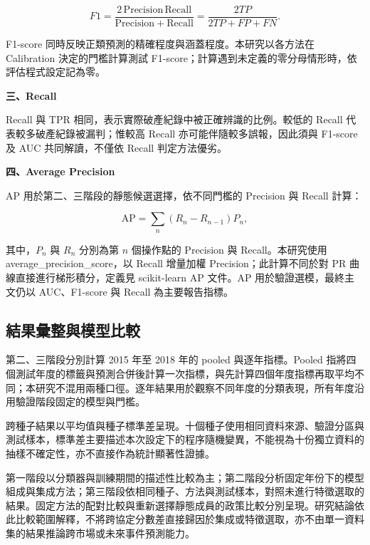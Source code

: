 \begin{equation}\label{eq:method-f1}
F1=\frac{2\,\mathrm{Precision}\,\mathrm{Recall}}
{\mathrm{Precision}+\mathrm{Recall}}
=\frac{2TP}{2TP+FP+FN}.
\end{equation}

F1-score 同時反映正類預測的精確程度與涵蓋程度。本研究以各方法在 Calibration 決定的門檻計算測試 F1-score；計算遇到未定義的零分母情形時，依評估程式設定記為零。

\textbf{三、Recall}

Recall 與 TPR 相同，表示實際破產紀錄中被正確辨識的比例。較低的 Recall 代表較多破產紀錄被漏判；惟較高 Recall 亦可能伴隨較多誤報，因此須與 F1-score 及 AUC 共同解讀，不僅依 Recall 判定方法優劣。

\textbf{四、Average Precision}

AP 用於第二、三階段的靜態候選選擇，依不同門檻的 Precision 與 Recall 計算：

\begin{equation}\label{eq:method-ap}
\mathrm{AP}=\sum_n(R_n-R_{n-1})P_n,
\end{equation}

其中，\(P_n\) 與 \(R_n\) 分別為第 \(n\) 個操作點的 Precision 與 Recall。本研究使用 {\normalfont average\_\allowbreak{}precision\_\allowbreak{}score}，以 Recall 增量加權 Precision；此計算不同於對 PR 曲線直接進行梯形積分，定義見 scikit-learn AP 文件\autocite{sklearn-ap-docs}。AP 用於驗證選模，最終主文仍以 AUC、F1-score 與 Recall 為主要報告指標。

\subsection{結果彙整與模型比較}

第二、三階段分別計算 2015 年至 2018 年的 pooled 與逐年指標。Pooled 指將四個測試年度的標籤與預測合併後計算一次指標，與先計算四個年度指標再取平均不同；本研究不混用兩種口徑。逐年結果用於觀察不同年度的分類表現，所有年度沿用驗證階段固定的模型與門檻。

跨種子結果以平均值與種子標準差呈現。十個種子使用相同資料來源、驗證分區與測試樣本，標準差主要描述本次設定下的程序隨機變異，不能視為十份獨立資料的抽樣不確定性，亦不直接作為統計顯著性證據。

第一階段以分類器與訓練期間的描述性比較為主；第二階段分析固定年份下的模型組成與集成方法；第三階段依相同種子、方法與測試樣本，對照未進行特徵選取的結果。固定方法的配對比較與重新選擇靜態成員的政策比較分別呈現。研究結論依此比較範圍解釋，不將跨協定分數差直接歸因於集成或特徵選取，亦不由單一資料集的結果推論跨市場或未來事件預測能力。
\endgroup
